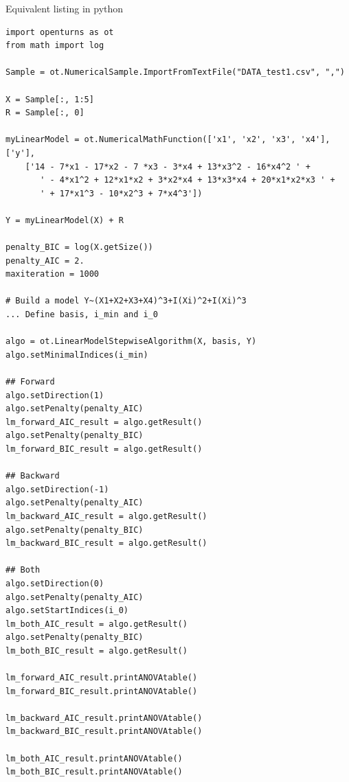 Equivalent listing in python
\begin{lstlisting}[style=pythonStyle]
import openturns as ot
from math import log

Sample = ot.NumericalSample.ImportFromTextFile("DATA_test1.csv", ",")

X = Sample[:, 1:5]
R = Sample[:, 0]

myLinearModel = ot.NumericalMathFunction(['x1', 'x2', 'x3', 'x4'], ['y'],
    ['14 - 7*x1 - 17*x2 - 7 *x3 - 3*x4 + 13*x3^2 - 16*x4^2 ' +
       ' - 4*x1^2 + 12*x1*x2 + 3*x2*x4 + 13*x3*x4 + 20*x1*x2*x3 ' +
       ' + 17*x1^3 - 10*x2^3 + 7*x4^3'])

Y = myLinearModel(X) + R

penalty_BIC = log(X.getSize())
penalty_AIC = 2.
maxiteration = 1000

# Build a model Y~(X1+X2+X3+X4)^3+I(Xi)^2+I(Xi)^3
... Define basis, i_min and i_0

algo = ot.LinearModelStepwiseAlgorithm(X, basis, Y)
algo.setMinimalIndices(i_min)

## Forward
algo.setDirection(1)
algo.setPenalty(penalty_AIC)
lm_forward_AIC_result = algo.getResult()
algo.setPenalty(penalty_BIC)
lm_forward_BIC_result = algo.getResult()

## Backward
algo.setDirection(-1)
algo.setPenalty(penalty_AIC)
lm_backward_AIC_result = algo.getResult()
algo.setPenalty(penalty_BIC)
lm_backward_BIC_result = algo.getResult()

## Both
algo.setDirection(0)
algo.setPenalty(penalty_AIC)
algo.setStartIndices(i_0)
lm_both_AIC_result = algo.getResult()
algo.setPenalty(penalty_BIC)
lm_both_BIC_result = algo.getResult()

lm_forward_AIC_result.printANOVAtable()
lm_forward_BIC_result.printANOVAtable()

lm_backward_AIC_result.printANOVAtable()
lm_backward_BIC_result.printANOVAtable()

lm_both_AIC_result.printANOVAtable()
lm_both_BIC_result.printANOVAtable()
\end{lstlisting}

